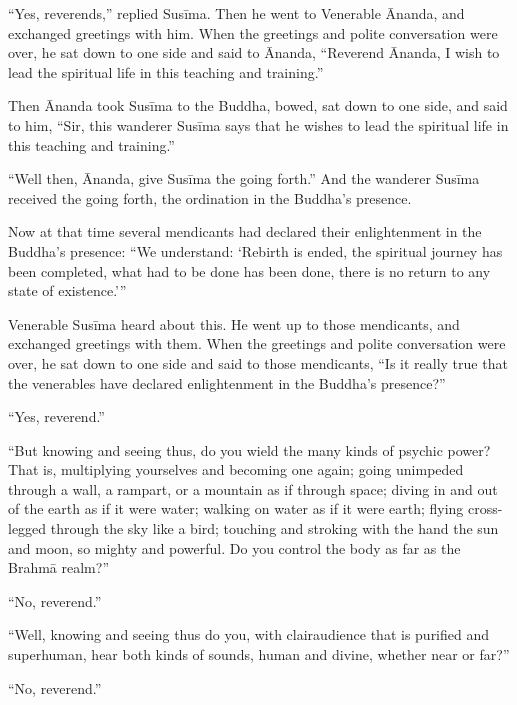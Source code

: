 \documentclass[12pt,openany]{book}%
\begin{document}
“Yes, reverends,” replied \textsanskrit{Susīma}. Then he went to Venerable Ānanda, and exchanged greetings with him. When the greetings and polite conversation were over, he sat down to one side and said to Ānanda, “Reverend Ānanda, I wish to lead the spiritual life in this teaching and training.” 

Then Ānanda took \textsanskrit{Susīma} to the Buddha, bowed, sat down to one side, and said to him, “Sir, this wanderer \textsanskrit{Susīma} says that he wishes to lead the spiritual life in this teaching and training.” 

“Well then, Ānanda, give \textsanskrit{Susīma} the going forth.” And the wanderer \textsanskrit{Susīma} received the going forth, the ordination in the Buddha’s presence. 

Now at that time several mendicants had declared their enlightenment in the Buddha’s presence: “We understand: ‘Rebirth is ended, the spiritual journey has been completed, what had to be done has been done, there is no return to any state of existence.’” 

Venerable \textsanskrit{Susīma} heard about this. He went up to those mendicants, and exchanged greetings with them. When the greetings and polite conversation were over, he sat down to one side and said to those mendicants, “Is it really true that the venerables have declared enlightenment in the Buddha’s presence?” 

“Yes, reverend.” 

“But knowing and seeing thus, do you wield the many kinds of psychic power? That is, multiplying yourselves and becoming one again; going unimpeded through a wall, a rampart, or a mountain as if through space; diving in and out of the earth as if it were water; walking on water as if it were earth; flying cross-legged through the sky like a bird; touching and stroking with the hand the sun and moon, so mighty and powerful. Do you control the body as far as the \textsanskrit{Brahmā} realm?” 

“No, reverend.” 

“Well, knowing and seeing thus do you, with clairaudience that is purified and superhuman, hear both kinds of sounds, human and divine, whether near or far?” 

“No, reverend.” 
\end{document}
